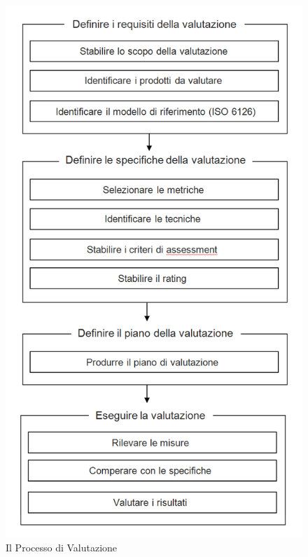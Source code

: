 \begin{figure}[h!]
	\centering
	\includegraphics[scale=.6]{img/schema_VAL.png}
	\caption{Il Processo di Valutazione}
	\label{fig:Il Processo di Valutazione}
\end{figure} 

\pagebreak
